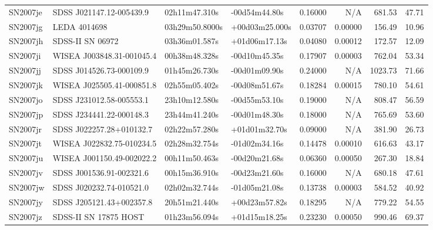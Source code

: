 \begin{longtable}{llllrrrr}
SN2007je         &        SDSS J021147.12-005439.9 &   02h11m47.310s &   -00d54m44.80s &  0.16000 &      N/A &   681.53 &       47.71 \\
SN2007jg         &                    LEDA 4014698 &  03h29m50.8000s &  +00d03m25.000s &  0.03707 &  0.00000 &   156.49 &       10.96 \\
SN2007jh         &                SDSS-II SN 06972 &   03h36m01.587s &   +01d06m17.13s &  0.04080 &  0.00012 &   172.57 &       12.09 \\
SN2007ji         &       WISEA J003848.31-001045.4 &   00h38m48.328s &   -00d10m45.35s &  0.17907 &  0.00003 &   762.04 &       53.34 \\
SN2007jj         &        SDSS J014526.73-000109.9 &   01h45m26.730s &   -00d01m09.90s &  0.24000 &      N/A &  1023.73 &       71.66 \\
SN2007jk         &       WISEA J025505.41-000851.8 &   02h55m05.402s &   -00d08m51.67s &  0.18284 &  0.00015 &   780.10 &       54.61 \\
SN2007jo         &        SDSS J231012.58-005553.1 &   23h10m12.580s &   -00d55m53.10s &  0.19000 &      N/A &   808.47 &       56.59 \\
SN2007jp         &        SDSS J234441.22-000148.3 &   23h44m41.240s &   -00d01m48.30s &  0.18000 &      N/A &   765.69 &       53.60 \\
SN2007jr         &        SDSS J022257.28+010132.7 &   02h22m57.280s &   +01d01m32.70s &  0.09000 &      N/A &   381.90 &       26.73 \\
SN2007jt         &       WISEA J022832.75-010234.5 &   02h28m32.754s &   -01d02m34.16s &  0.14478 &  0.00010 &   616.63 &       43.17 \\
SN2007ju         &       WISEA J001150.49-002022.2 &   00h11m50.463s &   -00d20m21.68s &  0.06360 &  0.00050 &   267.30 &       18.84 \\
SN2007jv         &        SDSS J001536.91-002321.6 &   00h15m36.910s &   -00d23m21.60s &  0.16000 &      N/A &   680.18 &       47.61 \\
SN2007jw         &        SDSS J020232.74-010521.0 &   02h02m32.744s &   -01d05m21.08s &  0.13738 &  0.00003 &   584.52 &       40.92 \\
SN2007jy         &        SDSS J205121.43+002357.8 &   20h51m21.440s &   +00d23m57.82s &  0.18295 &      N/A &   779.22 &       54.55 \\
SN2007jz         &           SDSS-II SN 17875 HOST &   01h23m56.094s &   +01d15m18.25s &  0.23230 &  0.00050 &   990.46 &       69.37 \\

\end{longtable}
